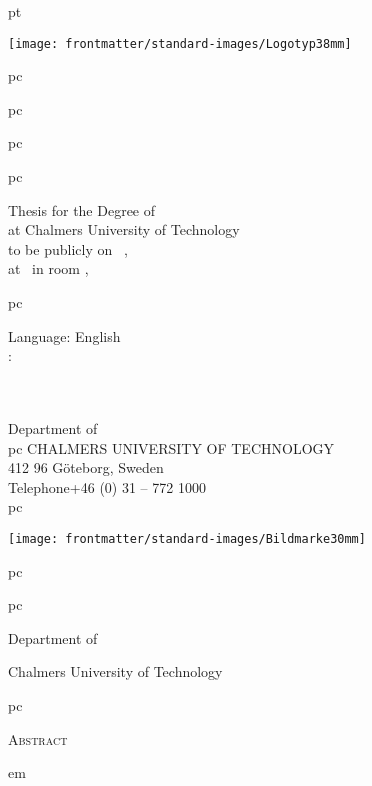 \documentclass[12pt,a4paper,pdftex]{article}
\begin{document}
\pagestyle{empty}

 pt

{\centering

  \texttt{[image: frontmatter/standard-images/Logotyp38mm]}

   pc 

  {\LARGE\thesistitle\par}

   pc

  {\large\thesissubtitle\par}

   pc

  {\Large\scshape\thesisauthor\par}

   pc

  Thesis for the Degree of
  \\%
  at Chalmers University of Technology\\
  to be publicly  
  on \ , \\
  at \ in room ,\ 

   pc

  Language: English\\
  : %
  \\
  \\
  \\

  \vfill
  
  Department of \thesisdepartment \\
   pc
  {\scshape  CHALMERS UNIVERSITY OF TECHNOLOGY}\\
  412 96 Göteborg, Sweden\\
  Telephone\enskip+46 (0) 31 -- 772 1000\\
  
   pc

  \texttt{[image: frontmatter/standard-images/Bildmarke30mm]}\par
}

\clearpage


\thesistitle

\thesissubtitle

 pc

{\scshape\thesisauthor}
 pc

Department of \thesisdepartment

Chalmers University of Technology

 pc

{\large\scshape Abstract}
\vspace{1 pc}

 em
\setlength{\parskip}{0.5ex plus 0.5ex}  %

\noindent


\vfill
\end{document}
